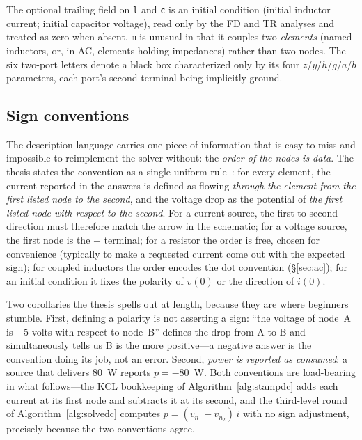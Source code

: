 \documentclass[11pt,oneside]{report}
\newcommand{\code}[1]{\texttt{#1}}
\begin{document}
The optional trailing field on \code{l} and \code{c} is an initial
condition (initial inductor current; initial capacitor voltage), read
only by the FD and TR analyses and treated as zero when absent.
\code{m} is unusual in that it couples two \emph{elements} (named
inductors, or, in AC, elements holding impedances) rather than two
nodes. The six two-port letters denote a black box characterized only
by its four $z$/$y$/$h$/$g$/$a$/$b$ parameters, each port's second
terminal being implicitly ground.

\subsection{Sign conventions}
\label{sec:signs}

The description language carries one piece of information that is
easy to miss and impossible to reimplement the solver without: the
\emph{order of the nodes is data}. The thesis states the convention
as a single uniform rule~\cite[\S2.11.1]{thesis2000}: for every
element, the current reported in the answers is defined as flowing
\emph{through the element from the first listed node to the second},
and the voltage drop as the potential of \emph{the first listed node
with respect to the second}. For a current source, the first-to-second
direction must therefore match the arrow in the schematic; for a
voltage source, the first node is the $+$ terminal; for a resistor
the order is free, chosen for convenience (typically to make a
requested current come out with the expected sign); for coupled
inductors the order encodes the dot convention (\S\ref{sec:ac}); for
an initial condition it fixes the polarity of $v(0)$ or the direction
of $i(0)$.

Two corollaries the thesis spells out at length, because they are
where beginners stumble. First, defining a polarity is not asserting
a sign: ``the voltage of node~A is $-5$ volts with respect to
node~B'' defines the drop from A to B and simultaneously tells us B
is the more positive---a negative answer is the convention doing its
job, not an error. Second, \emph{power is reported as consumed}: a
source that delivers 80~W reports $p = -80$~W. Both conventions are
load-bearing in what follows---the KCL bookkeeping of
Algorithm~\ref{alg:stampdc} adds each current at its first node and
subtracts it at its second, and the third-level round of
Algorithm~\ref{alg:solvedc} computes $p = (v_{n_1}-v_{n_2})\,i$ with
no sign adjustment, precisely because the two conventions agree.
\end{document}
